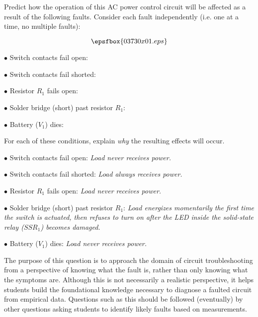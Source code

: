 

Predict how the operation of this AC power control circuit will be affected as a result of the following faults.  Consider each fault independently (i.e. one at a time, no multiple faults):

$$\epsfbox{03730x01.eps}$$

\medskip
\item{$\bullet$} Switch contacts fail open:
\vskip 5pt
\item{$\bullet$} Switch contacts fail shorted:
\vskip 5pt
\item{$\bullet$} Resistor $R_1$ fails open:
\vskip 5pt
\item{$\bullet$} Solder bridge (short) past resistor $R_1$:
\vskip 5pt
\item{$\bullet$} Battery ($V_1$) dies:
\medskip

For each of these conditions, explain {\it why} the resulting effects will occur.







\medskip
\item{$\bullet$} Switch contacts fail open: {\it Load never receives power.}
\vskip 5pt
\item{$\bullet$} Switch contacts fail shorted: {\it Load always receives power.}
\vskip 5pt
\item{$\bullet$} Resistor $R_1$ fails open: {\it Load never receives power.}
\vskip 5pt
\item{$\bullet$} Solder bridge (short) past resistor $R_1$: {\it Load energizes momentarily the first time the switch is actuated, then refuses to turn on after the LED inside the solid-state relay ($SSR_1$) becomes damaged.}
\vskip 5pt
\item{$\bullet$} Battery ($V_1$) dies: {\it Load never receives power.}
\medskip







The purpose of this question is to approach the domain of circuit troubleshooting from a perspective of knowing what the fault is, rather than only knowing what the symptoms are.  Although this is not necessarily a realistic perspective, it helps students build the foundational knowledge necessary to diagnose a faulted circuit from empirical data.  Questions such as this should be followed (eventually) by other questions asking students to identify likely faults based on measurements.




